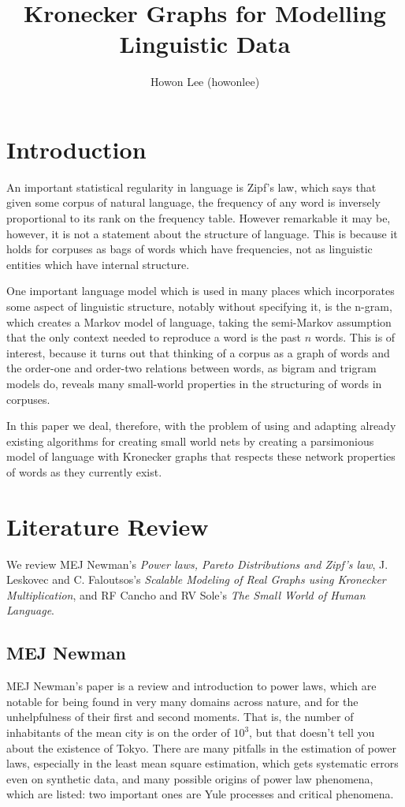 \documentclass[12pt]{article}
\begin{document}
\title{Kronecker Graphs for Modelling Linguistic Data}
\author{Howon Lee (howonlee)}
\maketitle

\section{Introduction}

An important statistical regularity in language is Zipf's law, which says that given some corpus of natural language, the frequency of any word is inversely proportional to its rank on the frequency table. However remarkable it may be, however, it is not a statement about the structure of language. This is because it holds for corpuses as bags of words which have frequencies, not as linguistic entities which have internal structure. \cite{smallworldlang}

One important language model which is used in many places which incorporates some aspect of linguistic structure, notably without specifying it, is the n-gram, which creates a Markov model of language, taking the semi-Markov assumption that the only context needed to reproduce a word is the past $n$ words. This is of interest, because it turns out that thinking of a corpus as a graph of words and the order-one and order-two relations between words, as bigram and trigram models do, reveals many small-world properties in the structuring of words in corpuses.

In this paper we deal, therefore, with the problem of using and adapting already existing algorithms for creating small world nets by creating a parsimonious model of language with Kronecker graphs that respects these network properties of words as they currently exist.

\section{Literature Review}

We review MEJ Newman's \emph{Power laws, Pareto Distributions and Zipf's law}\cite{mejpowerlaw}, J. Leskovec and C. Faloutsos's \emph{Scalable Modeling of Real Graphs using Kronecker Multiplication}\cite{kronfit}, and RF Cancho and RV Sole's \emph{The Small World of Human Language}\cite{smallworldlang}.

\subsection{MEJ Newman}
MEJ Newman's paper is a review and introduction to power laws, which are notable for being found in very many domains across nature, and for the unhelpfulness of their first and second moments. That is, the number of inhabitants of the mean city is on the order of $10^3$, but that doesn't tell you about the existence of Tokyo. There are many pitfalls in the estimation of power laws, especially in the least mean square estimation, which gets systematic errors even on synthetic data, and many possible origins of power law phenomena, which are listed: two important ones are Yule processes and critical phenomena.
\end{document}
